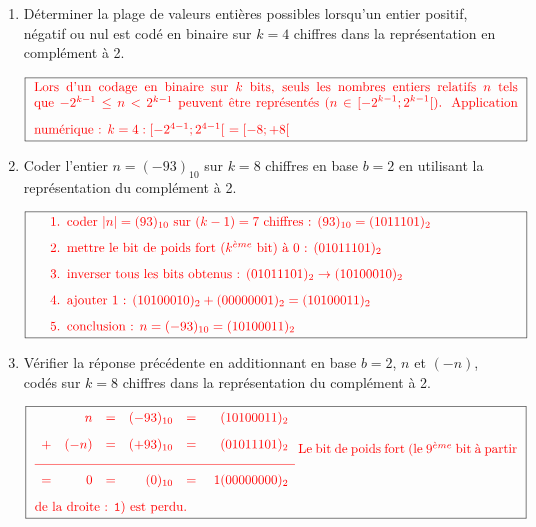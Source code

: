 \begin{enumerate}
\item Déterminer la plage de valeurs entières possibles lorsqu'un
	entier positif, négatif ou nul est codé en binaire 
	sur $k = 4$ chiffres dans la représentation en complément à 2.
	
	$$\framebox[13.5cm]{\color{red}\begin{minipage}{13cm}
	Lors d'un codage en binaire sur $k$ bits, 
	seuls les nombres entiers relatifs $n$ 
	tels que $-2^{k-1} \leq n < 2^{k-1}$ peuvent être représentés 
	($\displaystyle n \in [-2^{k-1};2^{k-1}[$).
	\vspace*{3mm}
	
	Application numérique : $k=4 : [-2^{4-1};2^{4-1}[ \ = [-8;+8[$
	\end{minipage}}$$

\item Coder l'entier $n = (- 93)_{10}$ sur $k = 8$ chiffres en base $b = 2$
	en utilisant la représentation du complément à 2.
	
	$$\framebox[13.5cm]{\color{red}
\begin{minipage}{13cm}
\begin{enumerate}
\item coder $|n|=(93)_{10}$ sur $(k-1) = 7$ chiffres :
	$(93)_{10} = (1011101)_2$ 
\item mettre le bit de poids fort ($k^{\grave eme}$ bit) à $0$ :
        $(01011101)_2$ 
\item inverser tous les bits obtenus :
        $(01011101)_2 \rightarrow (10100010)_2$
\item ajouter 1 : 
	$(10100010)_2 + (00000001)_2 = (10100011)_2$
\item conclusion :
	$n = (-93)_{10} = (10100011)_2$
\end{enumerate}
\end{minipage}}$$

\item Vérifier la réponse précédente en additionnant en base $b=2$,
	$n$ et $(-n)$, codés sur $k = 8$ chiffres dans la représentation
	du complément à 2.

	$$\framebox[13.5cm]{\color{red}\begin{minipage}{13cm}
$\begin{array}{lrrrrr}
  & n &=& (- 93)_{10} &=& \ (10100011)_2\\[3mm]
+ & (-n) &=& (+ 93)_{10} &=& \ (01011101)_2\\[3mm]
\hline
\\[-2mm]
= & 0 &=& (0)_{10} &=& \ 1(00000000)_2
\end{array}$
\vspace*{3mm}

Le bit de poids fort (le $9^{\grave eme}$ bit à partir de la droite : {\tt 1})
est perdu.
\end{minipage}}$$
\end{enumerate}

